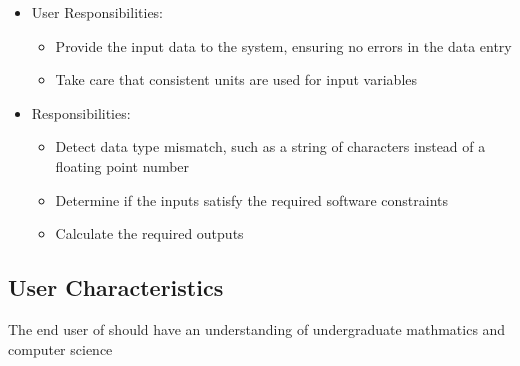 \documentclass[12pt]{article}
\begin{document}
\begin{itemize}
\item User Responsibilities:
\begin{itemize}
\item Provide the input data to the system, ensuring no errors in the data entry
\item Take care that consistent units are used for input variables
\end{itemize}

\item \progname{} Responsibilities:
\begin{itemize}
\item Detect data type mismatch, such as a string of characters instead of a floating point number
\item Determine if the inputs satisfy the required software constraints
\item Calculate the required outputs
\end{itemize}

\end{itemize}


\subsection{User Characteristics} \label{SecUserCharacteristics}

The end user of \progname{} should have an understanding of undergraduate mathmatics
and computer science
\end{document}
